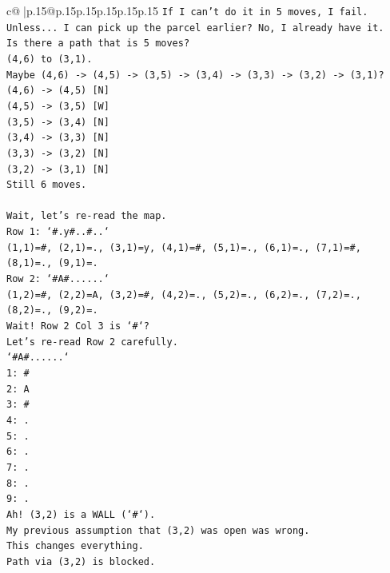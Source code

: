 \documentclass{article}
\begin{document}
{\begin{supertabular}{c@{$\;$}|p{.15\linewidth}@{}p{.15\linewidth}p{.15\linewidth}p{.15\linewidth}p{.15\linewidth}p{.15\linewidth}}
{{{\texttt{If I can't do it in 5 moves, I fail.} \\
\texttt{Unless... I can pick up the parcel earlier? No, I already have it.} \\
\texttt{Is there a path that is 5 moves?} \\
\texttt{(4,6) to (3,1).} \\
\texttt{Maybe (4,6) {-}> (4,5) {-}> (3,5) {-}> (3,4) {-}> (3,3) {-}> (3,2) {-}> (3,1)?} \\
\texttt{(4,6) {-}> (4,5) {[}N{]}} \\
\texttt{(4,5) {-}> (3,5) {[}W{]}} \\
\texttt{(3,5) {-}> (3,4) {[}N{]}} \\
\texttt{(3,4) {-}> (3,3) {[}N{]}} \\
\texttt{(3,3) {-}> (3,2) {[}N{]}} \\
\texttt{(3,2) {-}> (3,1) {[}N{]}} \\
\texttt{Still 6 moves.} \\
\\ 
\texttt{Wait, let's re{-}read the map.} \\
\texttt{Row 1: `\#.y\#..\#..`} \\
\texttt{(1,1)=\#, (2,1)=., (3,1)=y, (4,1)=\#, (5,1)=., (6,1)=., (7,1)=\#, (8,1)=., (9,1)=.} \\
\texttt{Row 2: `\#A\#......`} \\
\texttt{(1,2)=\#, (2,2)=A, (3,2)=\#, (4,2)=., (5,2)=., (6,2)=., (7,2)=., (8,2)=., (9,2)=.} \\
\texttt{Wait! Row 2 Col 3 is `\#`?} \\
\texttt{Let's re{-}read Row 2 carefully.} \\
\texttt{`\#A\#......`} \\
\texttt{1: \#} \\
\texttt{2: A} \\
\texttt{3: \#} \\
\texttt{4: .} \\
\texttt{5: .} \\
\texttt{6: .} \\
\texttt{7: .} \\
\texttt{8: .} \\
\texttt{9: .} \\
\texttt{Ah! (3,2) is a WALL (`\#`).} \\
\texttt{My previous assumption that (3,2) was open was wrong.} \\
\texttt{This changes everything.} \\
\texttt{Path via (3,2) is blocked.} \\
}}}
\end{supertabular}}
\end{document}
